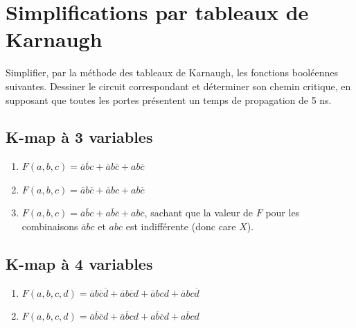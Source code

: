 \documentclass[a4paper,11pt]{article}
\newif\ifsolutions
\begin{document}
\section{Simplifications par tableaux de Karnaugh}
Simplifier, par la méthode des tableaux de Karnaugh, les fonctions booléennes suivantes. Dessiner le circuit correspondant et déterminer son chemin critique, en supposant que toutes les portes présentent un temps de propagation de 5 ns.

\subsection{K-map à 3 variables}
\begin{enumerate}
    \item $F(a,b,c) = \overline{a}\overline{b}c + \overline{a}b\overline{c} + ab\overline{c}$
    \item $F(a,b,c) = \overline{a}b\overline{c} + \overline{a}bc + ab\overline{c}$
    \item $F(a,b,c) = \overline{a}\overline{b}c + a\overline{b}\overline{c} + ab\overline{c}$, sachant que la valeur de $F$ pour les combinaisons $\overline{a}bc$ et $abc$ est indifférente (donc care $X$).
\end{enumerate}

\ifsolutions
\begin{solbox}
\begin{enumerate}
    \item $F(a,b,c) = \overline{a}\overline{b}c + b\overline{c}$
    \item $F(a,b,c) = \overline{a}b + b\overline{c} = b(\overline{a} + \overline{c})$
    \item $F(a,b,c) = \overline{a}c + a\overline{c} = a \oplus c$ (en utilisant les cares pour former des groupes de 2 optimaux).
\end{enumerate}
\end{solbox}
\fi

\subsection{K-map à 4 variables}
\begin{enumerate}
    \item $F(a,b,c,d) = \overline{a}b\overline{c}\overline{d} + \overline{a}b\overline{c}d + \overline{a}bcd + \overline{a}bc\overline{d}$
    \item $F(a,b,c,d) = \overline{a}\overline{b}\overline{c}d + \overline{a}\overline{b}cd + a\overline{b}\overline{c}d + a\overline{b}cd$
\end{enumerate}
\end{document}
